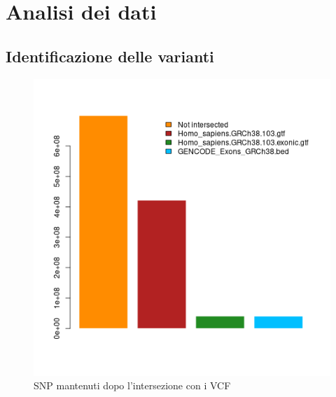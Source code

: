 \graphicspath{{chapters/04/media/}}
\chapter{Analisi dei dati}
\label{cha:analisi}

\section{Identificazione delle varianti}
 \begin{figure}[H]
   \centering
   \includegraphics[scale=1]{scelta_gtf.png}
   \caption{SNP mantenuti dopo l'intersezione con i VCF}
   \label{fig:proj_pipeline}
 \end{figure}

